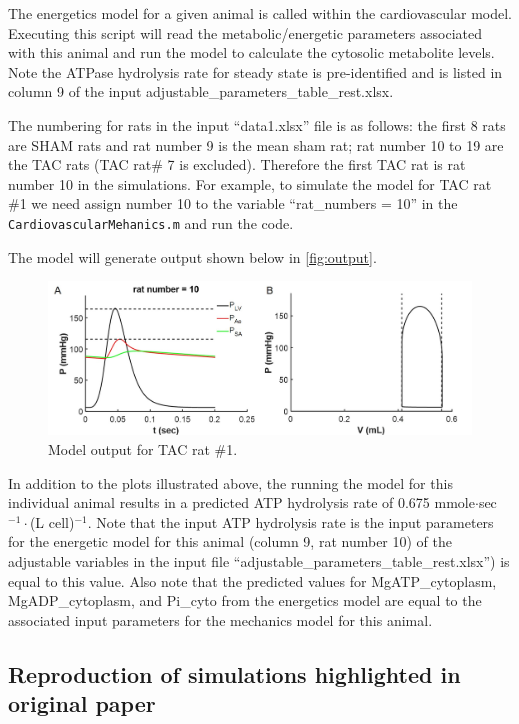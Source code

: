 \documentclass[fleqn,10pt]{physiome}
\begin{document}
The energetics model for a given animal is called within the cardiovascular model. Executing this script will read the metabolic/energetic parameters associated with this animal and run the model to calculate the cytosolic metabolite levels. Note the ATPase hydrolysis rate for steady state is pre-identified and is listed in column 9 of the input adjustable\_parameters\_table\_rest.xlsx. 

The numbering for rats in the input ``data1.xlsx'' file is as follows: the first 8 rats are SHAM rats and rat number 9 is the mean sham rat; rat number 10 to 19 are the TAC rats (TAC rat\# 7 is excluded). Therefore the first TAC rat is rat number 10 in the simulations. For example, to simulate the model for TAC rat \#1 we need assign number 10 to the variable ``rat\_numbers = 10'' in the \texttt{CardiovascularMehanics.m} and run the code. 

The model will generate output shown below in \autoref{fig:output}. 

\begin{figure}[ht]\centering
\includegraphics[width=1.0\linewidth]{FigS4.jpg}
\caption{Model output for TAC rat \#1.}\label{fig:output}
\end{figure}

In addition to the plots illustrated above, the running the model for this individual animal results in a predicted ATP hydrolysis rate of 0.675 mmole$\cdot$sec$^{-1}\cdot$(L cell)$^{-1}$. Note that the input ATP hydrolysis rate is the input parameters for the energetic model for this animal (column 9, rat number 10) of the adjustable variables in the input file ``adjustable\_parameters\_table\_rest.xlsx'') is equal to this value. Also note that the predicted values for MgATP\_cytoplasm, MgADP\_cytoplasm, and Pi\_cyto from the energetics model are equal to the associated input parameters for the mechanics model for this animal. 

\subsection{Reproduction of simulations highlighted in original paper}
\end{document}
